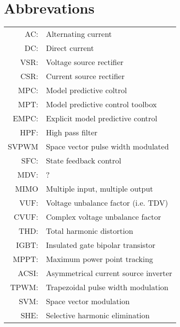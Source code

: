 \chapter*{Abbrevations}
\begin{longtable}{r l}
	AC:				& Alternating current\\
	DC:				& Direct current\\
  VSR:      & Voltage source rectifier \\
  CSR:      & Current source rectifier \\
  MPC:      & Model predictive coltrol\\
  MPT:      & Model predictive control toolbox\\
  EMPC:     & Explicit model predictive control\\
  HPF:      & High pass filter\\
  SVPWM     & Space vector pulse width modulated\\
  SFC:      & State feedback control\\
  MDV:      & ?\\
	MIMO			& Multiple input, multiple output\\
  VUF:      & Voltage unbalance factor (i.e. TDV)\\
	CVUF:			& Complex voltage unbalance factor\\
  THD:      & Total harmonic distortion\\
  IGBT:     & Insulated gate bipolar transistor\\
  MPPT:     & Maximum power point tracking\\
	ACSI:			& Asymmetrical current source inverter\\
	TPWM:			& Trapezoidal pulse width modulation\\
	SVM:			& Space vector modulation\\
	SHE:			& Selective harmonic elimination\\

\end{longtable} 